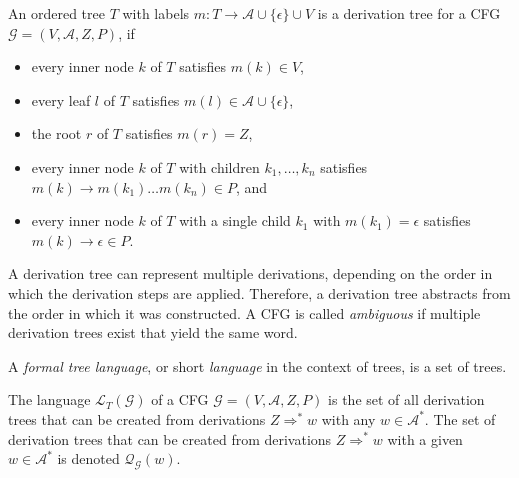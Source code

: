\documentclass[
    a4paper,
    12pt,
    twoside,
    BCOR=12mm,
    parskip=half,
    chapterprefix,
    numbers=noenddot,
    bibliography=totoc
]{scrbook}
\begin{document}
\begin{definition}
  \label{def:derivtree_cfg}
	An ordered tree $T$ with labels $m : T \to \mathcal{A} \cup \{\epsilon\} \cup V$ is a derivation tree for a \gls{CFG} $\mathcal{G}=(V, \mathcal{A}, Z, P)$, if
	\begin{itemize}[noitemsep]
		\item every inner node $k$ of $T$ satisfies $m(k) \in V$,
		\item every leaf $l$ of $T$ satisfies $m(l) \in \mathcal{A} \cup \{\epsilon\}$,
		\item the root $r$ of $T$ satisfies $m(r)=Z$,
		\item every inner node $k$ of $T$ with children $k_1,\ldots,k_n$ satisfies\\ $m(k) \to m(k_1) \ldots m(k_n) \in P$, and
		\item every inner node $k$ of $T$ with a single child $k_1$ with $m(k_1)=\epsilon$ satisfies $m(k) \to \epsilon \in P$.\qedhere
	\end{itemize}	
\end{definition}

A derivation tree can represent multiple derivations, depending on the order in which the derivation steps are applied. Therefore, a derivation tree abstracts from the order in which it was constructed. A \gls{CFG} is called \emph{ambiguous} if multiple derivation trees exist that yield the same word.

\begin{definition}
  \label{def:formaltreelanguage}
	A \emph{formal tree language}, or short \emph{language} in the context of trees, is a set of trees.
\end{definition}

The language $\mathcal{L}_T(\mathcal{G})$ of a \gls{CFG} $\mathcal{G}= (V, \mathcal{A}, Z, P)$ is the set of all derivation trees that can be created from derivations $Z \Rightarrow^* w$ with any $w \in \mathcal{A}^*$. The set of derivation trees that can be created from derivations $Z \Rightarrow^* w$ with a given $w \in \mathcal{A}^*$ is denoted $\mathcal{Q}_\mathcal{G}(w)$.
\end{document}
